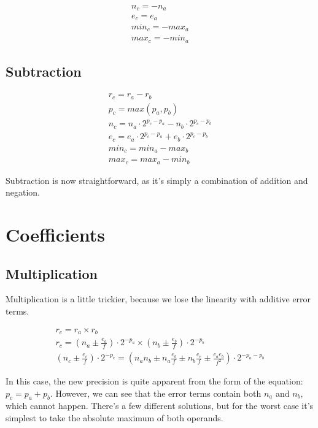\documentclass[10pt,a4paper]{article}
\numberwithin{equation}{section}
\numberwithin{equation}{subsection}
\begin{document}
	\begin{eqnarray}
		n_c = -n_a \\
		e_c = e_a \\
		min_c = -max_a \\
		max_c = -min_a
	\end{eqnarray}
	
	\subsection{Subtraction}
	
	\begin{eqnarray}
		r_c = r_a - r_b \\
		p_c = max(p_a, p_b) \\
		n_c = n_a\cdot 2^{p_c-p_a} - n_b\cdot 2^{p_c-p_b} \\
		e_c = e_a\cdot 2^{p_c-p_a} + e_b\cdot 2^{p_c-p_b} \\
		min_c = min_a - max_b \\
		max_c = max_a - min_b
	\end{eqnarray}
	
	Subtraction is now straightforward, as it's simply a combination of addition and negation.
	
	\section{Coefficients}
	
	\subsection{Multiplication}
	
	Multiplication is a little trickier, because we lose the linearity with additive error terms.
	
	\begin{eqnarray}
		r_c = r_a \times r_b \\
		r_c = (n_a \pm \frac{e_a}{f})\cdot 2^{-p_a} \times (n_b \pm \frac{e_b}{f})\cdot 2^{-p_b} \\
		(n_c \pm \frac{e_c}{f})\cdot 2^{-p_c} = ({n_a}{n_b} \pm {n_a}\frac{e_b}{f} \pm {n_b}\frac{e_e}{f} \pm \frac{{e_a}{e_b}}{f^2})\cdot 2^{-p_a-p_b}
	\end{eqnarray}
	
	In this case, the new precision is quite apparent from the form of the equation: $p_c = p_a + p_b$. However, we can see that the error terms contain both $n_a$ and $n_b$, which cannot happen. There's a few different solutions, but for the worst case it's simplest to take the absolute maximum of both operands.
	
\end{document}
